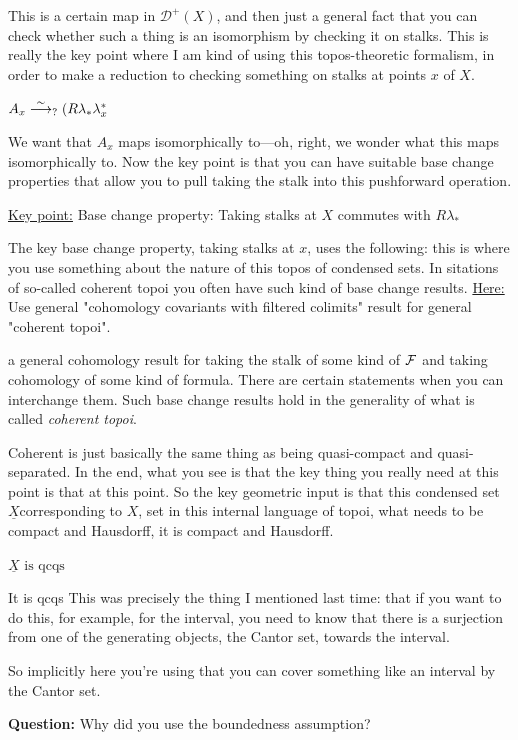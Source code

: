 This is a certain map in $\mathcal{D}^+(X)$, and then just a general fact that you can check whether such a thing is an isomorphism by checking it on stalks. 
This is really the key point where I am kind of using this topos-theoretic formalism, in order to make a reduction to checking something on stalks at points $x$ of $X$.

$A_x \overset\sim\longrightarrow_? (R  \lambda_\ast \lambda^\ast_x$

We want that $A_x$ maps isomorphically to---oh, right, we wonder what this maps isomorphically to. Now the key point is that you can have suitable base change properties that allow you to pull taking the stalk into this pushforward operation.

\underline{Key point:} Base change property: Taking stalks at $X$ commutes with $R \lambda_\ast$

The key base change property, taking stalks at $x$, uses the following: this is where you use something about the nature of this topos of condensed sets. 
In sitations of so-called coherent topoi you often have such kind of base change results. 
\underline{Here:} Use general "cohomology covariants with filtered colimits" result for general "coherent topoi".

a general cohomology result for taking the stalk of some kind of $\mathcal F$ and taking cohomology of some kind of formula. 
There are certain statements when you can interchange them. Such base change results hold in the generality of what is called \emph{coherent topoi}.

Coherent is just basically the same thing as being quasi-compact and quasi-separated. In the end, what you see is that the key thing you really need at this point is that at this point. 
So the key geometric input is that this condensed set $\underline{X}$corresponding to $X$, set in this internal language of topoi, what needs to be compact and Hausdorff, it is compact and Hausdorff. 

$ \underline{X} \text{ is qcqs}$

It is qcqs 
This was precisely the thing I mentioned last time: that if you want to do this, for example, for the interval, you need to know that there is a surjection from one of the generating objects, the Cantor set, towards the interval.

So implicitly here you're using that you can cover something like an interval by the Cantor set.

\textbf{Question:} Why did you use the boundedness assumption?

